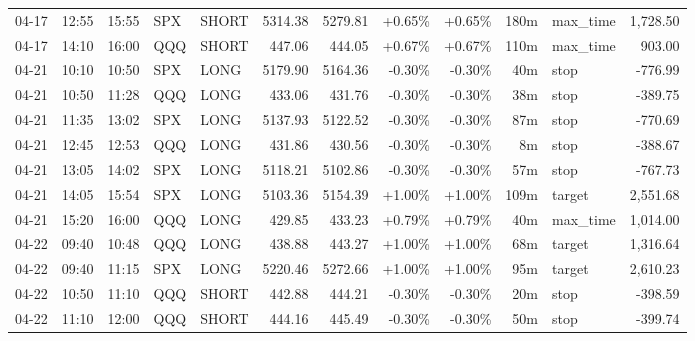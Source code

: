 \documentclass[11pt,a4paper,twoside]{article}
\begin{document}
\begin{center}
\begin{longtable}{>{\color{txtmain}}l l l l l r r r r r >{\color{txtmain}}l r}
04-17 & 12:55 & 15:55 & SPX & SHORT & 5314.38 & 5279.81 & \textcolor{wingreen}{+0.65\%} & \textcolor{wingreen}{+0.65\%} & 180m & max\_time & \textcolor{wingreen}{1,728.50} \\
04-17 & 14:10 & 16:00 & QQQ & SHORT & 447.06 & 444.05 & \textcolor{wingreen}{+0.67\%} & \textcolor{wingreen}{+0.67\%} & 110m & max\_time & \textcolor{wingreen}{903.00} \\
04-21 & 10:10 & 10:50 & SPX & LONG & 5179.90 & 5164.36 & \textcolor{lossred}{-0.30\%} & \textcolor{lossred}{-0.30\%} & 40m & stop & \textcolor{lossred}{-776.99} \\
04-21 & 10:50 & 11:28 & QQQ & LONG & 433.06 & 431.76 & \textcolor{lossred}{-0.30\%} & \textcolor{lossred}{-0.30\%} & 38m & stop & \textcolor{lossred}{-389.75} \\
04-21 & 11:35 & 13:02 & SPX & LONG & 5137.93 & 5122.52 & \textcolor{lossred}{-0.30\%} & \textcolor{lossred}{-0.30\%} & 87m & stop & \textcolor{lossred}{-770.69} \\
04-21 & 12:45 & 12:53 & QQQ & LONG & 431.86 & 430.56 & \textcolor{lossred}{-0.30\%} & \textcolor{lossred}{-0.30\%} & 8m & stop & \textcolor{lossred}{-388.67} \\
04-21 & 13:05 & 14:02 & SPX & LONG & 5118.21 & 5102.86 & \textcolor{lossred}{-0.30\%} & \textcolor{lossred}{-0.30\%} & 57m & stop & \textcolor{lossred}{-767.73} \\
04-21 & 14:05 & 15:54 & SPX & LONG & 5103.36 & 5154.39 & \textcolor{wingreen}{+1.00\%} & \textcolor{wingreen}{+1.00\%} & 109m & target & \textcolor{wingreen}{2,551.68} \\
04-21 & 15:20 & 16:00 & QQQ & LONG & 429.85 & 433.23 & \textcolor{wingreen}{+0.79\%} & \textcolor{wingreen}{+0.79\%} & 40m & max\_time & \textcolor{wingreen}{1,014.00} \\
04-22 & 09:40 & 10:48 & QQQ & LONG & 438.88 & 443.27 & \textcolor{wingreen}{+1.00\%} & \textcolor{wingreen}{+1.00\%} & 68m & target & \textcolor{wingreen}{1,316.64} \\
04-22 & 09:40 & 11:15 & SPX & LONG & 5220.46 & 5272.66 & \textcolor{wingreen}{+1.00\%} & \textcolor{wingreen}{+1.00\%} & 95m & target & \textcolor{wingreen}{2,610.23} \\
04-22 & 10:50 & 11:10 & QQQ & SHORT & 442.88 & 444.21 & \textcolor{lossred}{-0.30\%} & \textcolor{lossred}{-0.30\%} & 20m & stop & \textcolor{lossred}{-398.59} \\
04-22 & 11:10 & 12:00 & QQQ & SHORT & 444.16 & 445.49 & \textcolor{lossred}{-0.30\%} & \textcolor{lossred}{-0.30\%} & 50m & stop & \textcolor{lossred}{-399.74} \\

\end{longtable}
\end{center}
\end{document}
